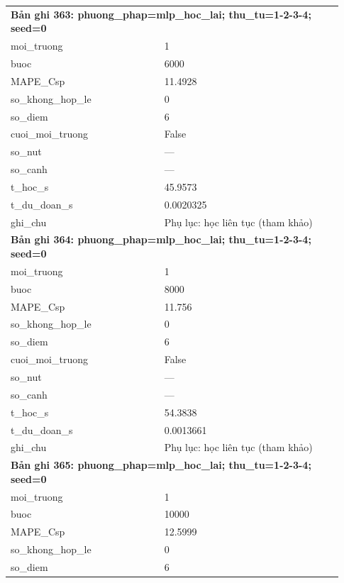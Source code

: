 \begin{longtable}{p{0.43\linewidth}p{0.50\linewidth}}
\midrule
\multicolumn{2}{p{0.95\linewidth}}{\textbf{Bản ghi 363: phuong\_phap=mlp\_hoc\_lai; thu\_tu=1-2-3-4; seed=0}} \\
moi\_\allowbreak truong & 1 \\
buoc & 6000 \\
MAPE\_\allowbreak Csp & 11.4928 \\
so\_\allowbreak khong\_\allowbreak hop\_\allowbreak le & 0 \\
so\_\allowbreak diem & 6 \\
cuoi\_\allowbreak moi\_\allowbreak truong & False \\
so\_\allowbreak nut & — \\
so\_\allowbreak canh & — \\
t\_\allowbreak hoc\_\allowbreak s & 45.9573 \\
t\_\allowbreak du\_\allowbreak doan\_\allowbreak s & 0.0020325 \\
ghi\_\allowbreak chu & Phụ lục: học liên tục (tham khảo) \\
\midrule
\multicolumn{2}{p{0.95\linewidth}}{\textbf{Bản ghi 364: phuong\_phap=mlp\_hoc\_lai; thu\_tu=1-2-3-4; seed=0}} \\
moi\_\allowbreak truong & 1 \\
buoc & 8000 \\
MAPE\_\allowbreak Csp & 11.756 \\
so\_\allowbreak khong\_\allowbreak hop\_\allowbreak le & 0 \\
so\_\allowbreak diem & 6 \\
cuoi\_\allowbreak moi\_\allowbreak truong & False \\
so\_\allowbreak nut & — \\
so\_\allowbreak canh & — \\
t\_\allowbreak hoc\_\allowbreak s & 54.3838 \\
t\_\allowbreak du\_\allowbreak doan\_\allowbreak s & 0.0013661 \\
ghi\_\allowbreak chu & Phụ lục: học liên tục (tham khảo) \\
\midrule
\multicolumn{2}{p{0.95\linewidth}}{\textbf{Bản ghi 365: phuong\_phap=mlp\_hoc\_lai; thu\_tu=1-2-3-4; seed=0}} \\
moi\_\allowbreak truong & 1 \\
buoc & 10000 \\
MAPE\_\allowbreak Csp & 12.5999 \\
so\_\allowbreak khong\_\allowbreak hop\_\allowbreak le & 0 \\
so\_\allowbreak diem & 6 \\

\end{longtable}
